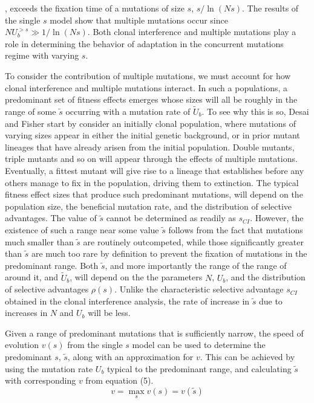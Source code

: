 \documentclass[12pt, one column]{article}
\begin{document}
, exceeds the fixation time of a mutations of size $s$, $s/\ln(Ns)$.  The results of the single $s$ model show that multiple mutations occur since $NU_b^{>s} \gg 1/\ln(Ns)$.  Both clonal interference and multiple mutations play a role in determining the behavior of adaptation in the concurrent mutations regime with varying $s$.

To consider the contribution of multiple mutations, we must account for how clonal interference and multiple mutations interact.  In such a populations, a predominant set of fitness effects emerges whose sizes will all be roughly in the range of some $\tilde{s}$ occurring with a mutation rate of $\tilde{U}_b$.  To see why this is so, Desai and Fisher start by consider an initially clonal population, where mutations of varying sizes appear in either the initial genetic background, or in prior mutant lineages that have already arisen from the initial population. Double mutants, triple mutants and so on will appear through the effects of multiple mutations.  Eventually, a fittest mutant will give rise to a lineage that establishes before any others manage to fix in the population, driving them to extinction.  The typical fitness effect sizes that produce such predominant mutations, will depend on the population size, the beneficial mutation rate, and the distribution of selective advantages.  The value of $\tilde{s}$ cannot be determined as readily as $s_{CI}$.  However, the existence of such a range near some value $\tilde{s}$ follows from the fact that mutations much smaller than $\tilde{s}$ are routinely outcompeted, while those significantly greater than $\tilde{s}$ are much too rare by definition to prevent the fixation of mutations in the predominant range.  Both $\tilde{s}$, and more importantly the range of the range of around it, and $\tilde{U}_b$, will depend on the the parameters $N$, $U_b$, and the distribution of selective advantages $\rho(s)$.  Unlike the characteristic selective advantage $s_{CI}$ obtained in the clonal interference analysis, the rate of increase in $\tilde{s}$ due to increases in $N$ and $U_b$ will be less.

Given a range of predominant mutations that is sufficiently narrow, the speed of evolution $v(s)$ from the single $s$ model can be used to determine the predominant $s$, $\tilde{s}$, along with an approximation for $v$.  This can be achieved by using the mutation rate $U_b$ typical to the predominant range, and calculating $\tilde{s}$ with corresponding $v$ from equation (5).
\begin{equation}
v = \max_{s} v(s)=v(\tilde{s})
\end{equation}
\end{document}
